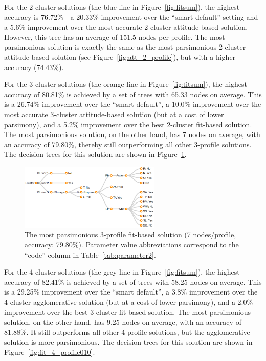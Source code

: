 For the 2-cluster solutions (the blue line in Figure~\ref{fig:fitsum}), the highest accuracy is 76.72\%---a 20.33\% improvement over the ``smart default'' setting and a 5.6\% improvement over the most accurate 2-cluster attitude-based solution. However, this tree has an average of 151.5 nodes per profile. The most parsimonious solution is exactly the same as the most parsimonious 2-cluster attitude-based solution (see Figure~\ref{fig:att_2_profile}), but with a higher accuracy (74.43\%).

For the 3-cluster solutions (the orange line in Figure~\ref{fig:fitsum}), the highest accuracy of 80.81\% is achieved by a set of trees with 65.33 nodes on average. This is a 26.74\% improvement over the ``smart default'', a 10.0\% improvement over the most accurate 3-cluster attitude-based solution (but at a cost of lower parsimony), and a 5.2\% improvement over the best 2-cluster fit-based solution. The most parsimonious solution, on the other hand, has 7 nodes on average, with an accuracy of 79.80\%, thereby still outperforming all other 3-profile solutions. The decision trees for this solution are shown in Figure~\ref{fig:fit_3_profile001}.

\begin{figure}
	\centering
	\includegraphics[width=0.6\textwidth]{figures/fit_3_profile001.png}
	\caption{The most parsimonious 3-profile fit-based solution (7 nodes/profile, accuracy: 79.80\%). Parameter value abbreviations correspond to the ``code'' column in Table~\ref{tab:parameter2}.}
	\label{fig:fit_3_profile001}
\end{figure}

For the 4-cluster solutions (the grey line in Figure~\ref{fig:fitsum}), the highest accuracy of 82.41\% is achieved by a set of trees with 58.25 nodes on average. This is a 29.25\% improvement over the ``smart default'', a 3.8\% improvement over the 4-cluster agglomerative solution (but at a cost of lower parsimony), and a 2.0\% improvement over the best 3-cluster fit-based solution. The most parsimonious solution, on the other hand, has 9.25 nodes on average, with an accuracy of 81.88\%. It still outperforms all other 4-profile solutions, but the agglomerative solution is more parsimonious. The decision trees for this solution are shown in Figure~\ref{fig:fit_4_profile010}.

